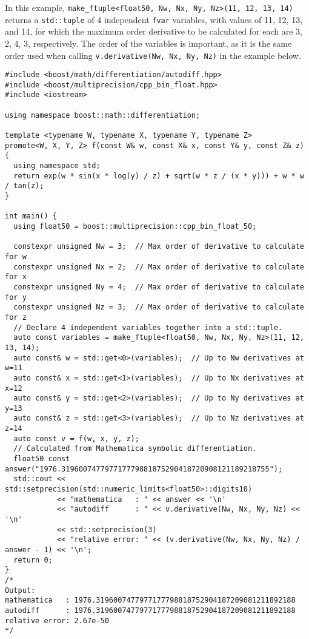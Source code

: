 \documentclass{article}
\begin{document}
In this example, {\tt make\_ftuple<float50, Nw, Nx, Ny, Nz>(11, 12, 13, 14)} returns a {\tt std::tuple} of 4
independent {\tt fvar} variables, with values of 11, 12, 13, and 14, for which the maximum order derivative to
be calculated for each are 3, 2, 4, 3, respectively. The order of the variables is important, as it is the same
order used when calling {\tt v.derivative(Nw, Nx, Ny, Nz)} in the example below.

\begin{verbatim}
#include <boost/math/differentiation/autodiff.hpp>
#include <boost/multiprecision/cpp_bin_float.hpp>
#include <iostream>

using namespace boost::math::differentiation;

template <typename W, typename X, typename Y, typename Z>
promote<W, X, Y, Z> f(const W& w, const X& x, const Y& y, const Z& z) {
  using namespace std;
  return exp(w * sin(x * log(y) / z) + sqrt(w * z / (x * y))) + w * w / tan(z);
}

int main() {
  using float50 = boost::multiprecision::cpp_bin_float_50;

  constexpr unsigned Nw = 3;  // Max order of derivative to calculate for w
  constexpr unsigned Nx = 2;  // Max order of derivative to calculate for x
  constexpr unsigned Ny = 4;  // Max order of derivative to calculate for y
  constexpr unsigned Nz = 3;  // Max order of derivative to calculate for z
  // Declare 4 independent variables together into a std::tuple.
  auto const variables = make_ftuple<float50, Nw, Nx, Ny, Nz>(11, 12, 13, 14);
  auto const& w = std::get<0>(variables);  // Up to Nw derivatives at w=11
  auto const& x = std::get<1>(variables);  // Up to Nx derivatives at x=12
  auto const& y = std::get<2>(variables);  // Up to Ny derivatives at y=13
  auto const& z = std::get<3>(variables);  // Up to Nz derivatives at z=14
  auto const v = f(w, x, y, z);
  // Calculated from Mathematica symbolic differentiation.
  float50 const answer("1976.319600747797717779881875290418720908121189218755");
  std::cout << std::setprecision(std::numeric_limits<float50>::digits10)
            << "mathematica   : " << answer << '\n'
            << "autodiff      : " << v.derivative(Nw, Nx, Ny, Nz) << '\n'
            << std::setprecision(3)
            << "relative error: " << (v.derivative(Nw, Nx, Ny, Nz) / answer - 1) << '\n';
  return 0;
}
/*
Output:
mathematica   : 1976.3196007477977177798818752904187209081211892188
autodiff      : 1976.3196007477977177798818752904187209081211892188
relative error: 2.67e-50
*/
\end{verbatim}
\end{document}
